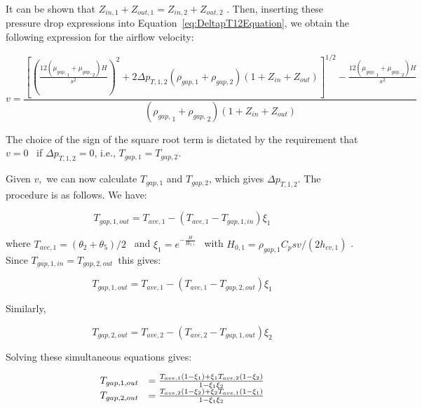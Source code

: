 It can be shown that \({Z_{in,1}} + {Z_{out,1}} = {Z_{in,2}} + {Z_{out,2}}\) . Then, inserting these pressure drop expressions into Equation~\ref{eq:DeltapT12Equation}, we obtain the following expression for the airflow velocity:

\begin{equation}
v = \frac{{{{\left[ {{{\left( {\frac{{12({\mu_{gap,}}_1 + {\mu_{gap,}}_2)H}}{{{s^2}}}} \right)}^2} + 2\Delta {p_{T,1,2}}({\rho_{gap,1}} + {\rho_{gap,2}})(1 + {Z_{in}} + {Z_{out}})} \right]}^{1/2}} - \frac{{12({\mu_{gap,}}_1 + {\mu_{gap,}}_2)H}}{{{s^2}}}}}{{({\rho_{gap,}}_1 + {\rho_{gap,}}_2)(1 + {Z_{in}} + {Z_{out}})}}
\label{eq:AirFlowVelocityEquation}
\end{equation}

The choice of the sign of the square root term is dictated by the requirement that \(v = 0\) ~if \(\Delta {p_{T,1,2}} = 0\), i.e., \({T_{gap,1}} = {T_{gap,2}}\).

Given \(v\),~we can now calculate \({T_{gap,1}}\) and \({T_{gap,2}}\), which gives \(\Delta {p_{T,1,2}}\). The procedure is as follows. We have:

\begin{equation}
{T_{gap,1,out}} = {T_{ave,1}} - ({T_{ave,1}} - {T_{gap,1,in}}){\xi_1}
\end{equation}

where \({T_{ave,1}} = ({\theta_2} + {\theta_5})/2\) ~and \({\xi_1} = {e^{ - \frac{H}{{{H_{0,1}}}}}}\) ~with \({H_{0,1}} = {\rho_{gap,1}}{C_p}sv/(2{h_{cv,1}})\) . Since \({T_{gap,1,in}} = {T_{gap,2,out}}\)~this gives:

\begin{equation}
{T_{gap,1,out}} = {T_{ave,1}} - ({T_{ave,1}} - {T_{gap,2,out}}){\xi_1}
\end{equation}

Similarly,

\begin{equation}
{T_{gap,2,out}} = {T_{ave,2}} - ({T_{ave,2}} - {T_{gap,1,out}}){\xi_2}
\end{equation}

Solving these simultaneous equations gives:

\begin{equation}
  \begin{array}{rl}
    T_{gap,1,out} &= \frac{T_{ave,1}\left(1 - \xi_1\right) + \xi_1 T_{ave,2}\left(1 - \xi_2\right)}{1 - \xi_1 \xi_2} \\
    T_{gap,2,out} &= \frac{T_{ave,2}\left(1 - \xi_2\right) + \xi_2 T_{ave,1}\left(1 - \xi_1\right)}{1 - \xi_1 \xi_2}
  \end{array}
\end{equation}


